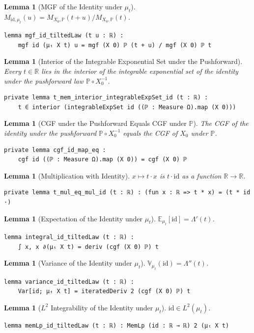 \documentclass{article}
\newtheorem{lemma}[theorem]{Lemma}
\newcommand{\E}{\mathbb{E}}
\renewcommand{\P}{\mathbb{P}}
\newcommand{\R}{\mathbb{R}}
\newcommand{\Var}{\mathbb{V}}
\begin{document}
\begin{lemma}[MGF of the Identity under $\mu_t$]
  $M_{\mathrm{id}, \mu_t}(u) = M_{X_0, \P}(t + u) / M_{X_0, \P}(t)$.
\end{lemma}
\begin{lstlisting}
lemma mgf_id_tiltedLaw (t u : ℝ) :
    mgf id (μₜ X t) u = mgf (X 0) ℙ (t + u) / mgf (X 0) ℙ t
\end{lstlisting}
\begin{lemma}[Interior of the Integrable Exponential Set under the Pushforward]
  Every $t \in \R$ lies in the interior of the integrable exponential set of the identity under the pushforward law $\P \circ X_0^{-1}$.
\end{lemma}
\begin{lstlisting}
private lemma t_mem_interior_integrableExpSet_id (t : ℝ) :
    t ∈ interior (integrableExpSet id ((ℙ : Measure Ω).map (X 0)))
\end{lstlisting}
\begin{lemma}[CGF under the Pushforward Equals CGF under $\P$]
  The CGF of the identity under the pushforward $\P \circ X_0^{-1}$ equals the CGF of $X_0$ under $\P$.
\end{lemma}
\begin{lstlisting}
private lemma cgf_id_map_eq :
    cgf id ((ℙ : Measure Ω).map (X 0)) = cgf (X 0) ℙ
\end{lstlisting}
\begin{lemma}[Multiplication with Identity]
  $x \mapsto t \cdot x$ is $t \cdot \mathrm{id}$ as a function $\R \to \R$.
\end{lemma}
\begin{lstlisting}
private lemma t_mul_eq_mul_id (t : ℝ) : (fun x : ℝ => t * x) = (t * id ·)
\end{lstlisting}
\begin{lemma}[Expectation of the Identity under $\mu_t$]
  $\E_{\mu_t}[\mathrm{id}] = \Lambda'(t)$.
\end{lemma}
\begin{lstlisting}
lemma integral_id_tiltedLaw (t : ℝ) :
    ∫ x, x ∂(μₜ X t) = deriv (cgf (X 0) ℙ) t
\end{lstlisting}
\begin{lemma}[Variance of the Identity under $\mu_t$]
  $\Var_{\mu_t}(\mathrm{id}) = \Lambda''(t)$.
\end{lemma}
\begin{lstlisting}
lemma variance_id_tiltedLaw (t : ℝ) :
    Var[id; μₜ X t] = iteratedDeriv 2 (cgf (X 0) ℙ) t
\end{lstlisting}
\begin{lemma}[$L^2$ Integrability of the Identity under $\mu_t$]
  $\mathrm{id} \in L^2(\mu_t)$.
\end{lemma}
\begin{lstlisting}
lemma memLp_id_tiltedLaw (t : ℝ) : MemLp (id : ℝ → ℝ) 2 (μₜ X t)
\end{lstlisting}
\newpage
\end{document}
